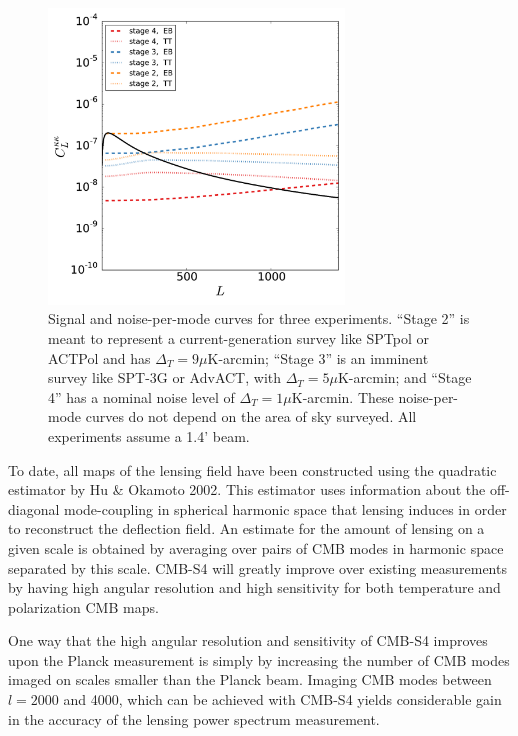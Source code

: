 \documentclass{tcibook}
\begin{document}
\begin{figure}[h]
\centering
\includegraphics[width=0.7\textwidth]{n0s_s4.pdf}
\caption{Signal and noise-per-mode curves for three experiments. ``Stage 2'' is meant to represent a current-generation survey like SPTpol or ACTPol and has $\Delta_T = 9 \mu$K-arcmin; ``Stage 3'' is an imminent survey like SPT-3G or AdvACT, with $\Delta_T = 5 \mu$K-arcmin; and ``Stage 4'' has a nominal noise level of  $\Delta_T = 1 \mu$K-arcmin.   These noise-per-mode curves do not depend on the area of sky surveyed.  All experiments assume a 1.4' beam.}  
\label{n0s_s4}
\end{figure}


To date, all maps of the lensing field have been constructed using the quadratic estimator by Hu \& Okamoto 2002.  This estimator uses information about the off-diagonal mode-coupling in spherical harmonic space that lensing induces in order to reconstruct the deflection field.  An estimate for the amount of lensing on a given scale is obtained by averaging over pairs of CMB modes in harmonic space separated by this scale. CMB-S4 will greatly improve over existing measurements by having high angular resolution and high sensitivity for both temperature and polarization CMB maps.

One way that the high angular resolution and sensitivity
of CMB-S4 improves upon the Planck measurement is simply
by increasing the number of CMB modes imaged on scales smaller than the Planck beam.  Imaging CMB modes between $l=2000$ and 4000, which can be achieved with CMB-S4 yields considerable gain in the accuracy of the lensing power spectrum measurement.
\end{document}
